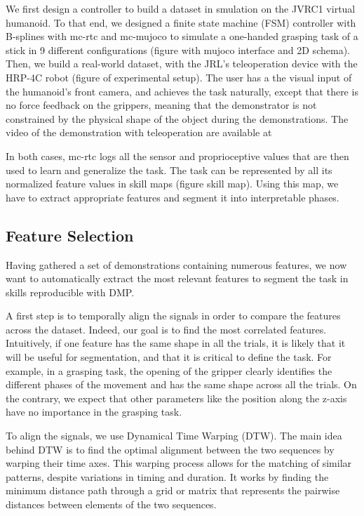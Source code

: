\documentclass[conference]{IEEEtran}
\begin{document}
 We first design a controller to build a dataset in  smulation on the JVRC1 virtual humanoid. To that end, we designed a finite state machine (FSM) controller with B-splines with mc-rtc and mc-mujoco \cite{singh2023mc} to simulate a one-handed grasping task of a stick in 9 different configurations (figure with mujoco interface and 2D schema). Then, we build a real-world dataset, with the JRL's teleoperation device  with the HRP-4C robot (figure  of experimental setup). The user has a the visual input of the humanoid's front camera, and achieves the task naturally, except that there is no force  feedback on the grippers, meaning that the demonstrator is not constrained by the physical shape of the object during the demonstrations. The video of the demonstration with teleoperation are available at 

 In both cases, mc-rtc logs all the sensor and proprioceptive values that are then used to learn and generalize the task. The task can be represented by all its normalized feature values in skill maps (figure skill map). Using this map, we have to extract appropriate features and segment it into interpretable phases.

\subsection{Feature Selection} \label{feature_selection}

Having gathered a set of demonstrations containing numerous features, we now want to automatically extract the most relevant features to segment the task in skills reproducible with DMP.

A first step is to temporally align the signals in order to compare the features across the dataset. Indeed, our goal is to find the most correlated features. Intuitively, if one feature has the same shape in all the trials, it is likely that it will be useful for segmentation, and that it is critical to define the task. For example, in a grasping task, the opening of the gripper clearly identifies the different phases of the movement and has the same shape across all the trials. On the contrary, we expect that other parameters like the position along the z-axis have no importance in the grasping task.

To align the signals, we use Dynamical Time Warping (DTW). The main idea behind DTW is to find the optimal alignment between the two sequences by warping their time axes. This warping process allows for the matching of similar patterns, despite variations in timing and duration. It works by finding the minimum distance path through a grid or matrix that represents the pairwise distances between elements of the two sequences. \newline
\end{document}
